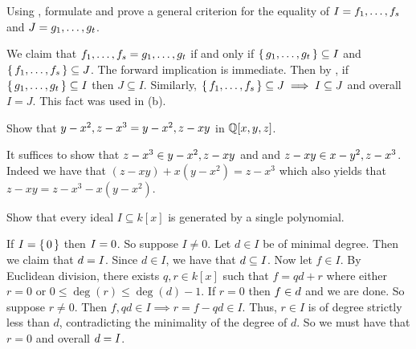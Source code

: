 \documentclass[letterpaper, 11pt, oneside]{book}
\begin{document}
\begin{exercise}\label{ex:UAG_1.1.4}
  Using , formulate and prove a general criterion for the equality of $I = \ideal{f_{1}, \ldots, f_{s}}$ and $J = \ideal{g_{1}, \ldots, g_{t}}$.
\end{exercise}
\begin{pf}
  We claim that $\ideal{f_{1}, \ldots, f_{s}} = \ideal{g_{1}, \ldots, g_{t}}$ if and only if $\set{g_{1}, \ldots, g_{t}} \subseteq I$ and $\set{f_{1}, \ldots, f_{s}} \subseteq J$.
  The forward implication is immediate.
  Then by , if $\set{g_{1}, \ldots, g_{t}} \subseteq I$ then $J \subseteq I$.
  Similarly, $\set{f_{1}, \ldots, f_{s}} \subseteq J \implies I \subseteq J$ and overall $I = J$.
  This fact was used in  (b).
\end{pf}

\begin{exercise}\label{ex:UAG_1.1.5}
  Show that $\ideal{y - x^{2}, z - x^{3}} = \ideal{y - x^{2}, z - xy}$ in $\mathbb{Q}[x, y, z]$.
\end{exercise}
\begin{pf}
  It suffices to show that $z - x^{3} \in \ideal{y - x^{2}, z - xy}$ and and $z - xy \in \ideal{x - y^{2}, z - x^{3}}$.
  Indeed we have that $(z - xy) + x(y - x^{2}) = z - x^{3}$ which also yields that $z - xy = z - x^{3} - x(y - x^{2})$.
\end{pf}

\clearpage

\begin{exercise}\label{ex:UAG_1.1.6}
  Show that every ideal $I \subseteq k[x]$ is generated by a single polynomial.
\end{exercise}
\begin{pf}
  If $I = \set{0}$ then $I = \ideal{0}$.
  So suppose $I \neq 0$.
  Let $d \in I$ be of minimal degree.
  Then we claim that $\ideal{d} = I$.
  Since $d \in I$, we have that $\ideal{d} \subseteq I$.
  Now let $f \in I$.
  By Euclidean division, there exists $q, r \in k[x]$ such that $f = qd + r$ where either $r = 0$ or $0 \leq \deg(r) \leq \deg(d) - 1$.
  If $r = 0$ then $f \in \ideal{d}$ and we are done.
  So suppose $r \neq 0$.
  Then $f, qd \in I \implies r = f - qd \in I$.
  Thus, $r \in I$ is of degree strictly less than $d$, contradicting the minimality of the degree of $d$.
  So we must have that $r = 0$ and overall $\ideal{d} = I$.
\end{pf}
\end{document}

